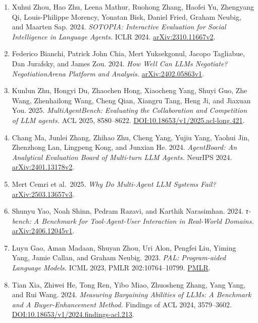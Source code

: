 \documentclass[10pt,a4paper]{article}
\newcommand{\tightlist}{\setlength{\itemsep}{1pt}\setlength{\parskip}{0pt}}
\begin{document}
\begin{enumerate}
\def\labelenumi{\arabic{enumi}.}
\tightlist
\item
  Xuhui Zhou, Hao Zhu, Leena Mathur, Ruohong Zhang, Haofei Yu, Zhengyang Qi, Louis-Philippe Morency, Yonatan Bisk, Daniel Fried, Graham Neubig, and Maarten Sap. 2024. \emph{SOTOPIA: Interactive Evaluation for Social Intelligence in Language Agents.} ICLR 2024. \href{https://arxiv.org/abs/2310.11667v2}{arXiv:2310.11667v2}.
\item
  Federico Bianchi, Patrick John Chia, Mert Yuksekgonul, Jacopo Tagliabue, Dan Jurafsky, and James Zou. 2024. \emph{How Well Can LLMs Negotiate? NegotiationArena Platform and Analysis.} \href{https://arxiv.org/abs/2402.05863v1}{arXiv:2402.05863v1}.
\item
  Kunlun Zhu, Hongyi Du, Zhaochen Hong, Xiaocheng Yang, Shuyi Guo, Zhe Wang, Zhenhailong Wang, Cheng Qian, Xiangru Tang, Heng Ji, and Jiaxuan You. 2025. \emph{MultiAgentBench: Evaluating the Collaboration and Competition of LLM agents.} ACL 2025, 8580--8622. \href{https://aclanthology.org/2025.acl-long.421/}{DOI:10.18653/v1/2025.acl-long.421}.
\item
  Chang Ma, Junlei Zhang, Zhihao Zhu, Cheng Yang, Yujiu Yang, Yaohui Jin, Zhenzhong Lan, Lingpeng Kong, and Junxian He. 2024. \emph{AgentBoard: An Analytical Evaluation Board of Multi-turn LLM Agents.} NeurIPS 2024. \href{https://arxiv.org/abs/2401.13178v2}{arXiv:2401.13178v2}.
\item
  Mert Cemri et al.~2025. \emph{Why Do Multi-Agent LLM Systems Fail?} \href{https://arxiv.org/abs/2503.13657v3}{arXiv:2503.13657v3}.
\item
  Shunyu Yao, Noah Shinn, Pedram Razavi, and Karthik Narasimhan. 2024. \emph{τ-bench: A Benchmark for Tool-Agent-User Interaction in Real-World Domains.} \href{https://arxiv.org/abs/2406.12045v1}{arXiv:2406.12045v1}.
\item
  Luyu Gao, Aman Madaan, Shuyan Zhou, Uri Alon, Pengfei Liu, Yiming Yang, Jamie Callan, and Graham Neubig. 2023. \emph{PAL: Program-aided Language Models.} ICML 2023, PMLR 202:10764--10799. \href{https://proceedings.mlr.press/v202/gao23f.html}{PMLR}.
\item
  Tian Xia, Zhiwei He, Tong Ren, Yibo Miao, Zhuosheng Zhang, Yang Yang, and Rui Wang. 2024. \emph{Measuring Bargaining Abilities of LLMs: A Benchmark and A Buyer-Enhancement Method.} Findings of ACL 2024, 3579--3602. \href{https://aclanthology.org/2024.findings-acl.213/}{DOI:10.18653/v1/2024.findings-acl.213}.
\end{enumerate}
\end{document}
